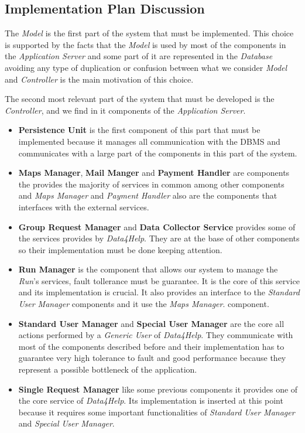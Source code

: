 \subsection{Implementation Plan Discussion}
\myparagraph{}
The \textit{Model} is the first part of the system that must be implemented. This choice is supported by the facts that the \textit{Model} is used by most of the components in the \textit{Application Server} and some part of it are represented in the \textit{Database} avoiding any type of duplication or confusion between what we consider \textit{Model} and \textit{Controller} is the main motivation of this choice.

\myparagraph{}
The second most relevant part of the system that must be developed is the \textit{Controller}, and we find in it components of the \textit{Application Server}.
\begin{itemize}
  \item \textbf{Persistence Unit} is the first component of this part that must be implemented because it manages all communication with the DBMS and communicates with a large part of the components in this part of the system.
  \item \textbf{Maps Manager}, \textbf{Mail Manger} and \textbf{Payment Handler} are components the provides the majority of services in common among other components and \textit{Maps Manager} and \textit{Payment Handler} also are the components that interfaces with the external services.
  \item \textbf{Group Request Manager} and \textbf{Data Collector Service} provides some of the services provides by \textit{Data4Help}. They are at the base of other components so their implementation must be done keeping attention.
  \item \textbf{Run Manager} is the component that allows our system to manage the \textit{Run}'s services, fault tollerance must be guarantee. It is the core of this service and its implementation is crucial. It also provides an interface to the \textit{Standard User Manager} components and it use the \textit{Maps Manager}. component.
  \item \textbf{Standard User Manager} and \textbf{Special User Manager} are the core all actions performed by a \textit{Generic User} of \textit{Data4Help}. They communicate with most of the components described before and their implementation has to guarantee very high tolerance to fault and good performance because they represent a possible bottleneck of the application.
  \item \textbf{Single Request Manager} like some previous components it provides one of the core service of \textit{Data4Help}. Its implementation is inserted at this point because it requires some important functionalities of \textit{Standard User Manager} and \textit{Special User Manager}.
\end{itemize}

